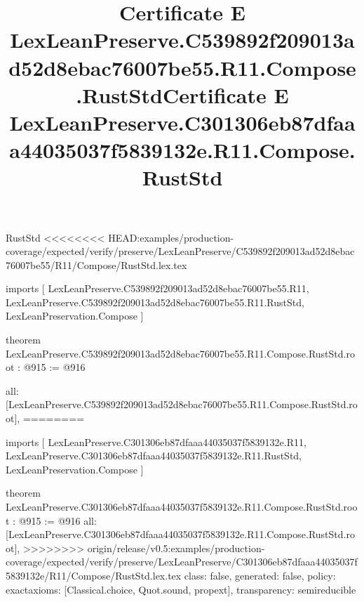 \begin{lexlean}{RustStd}
<<<<<<<< HEAD:examples/production-coverage/expected/verify/preserve/LexLeanPreserve/C539892f209013ad52d8ebac76007be55/R11/Compose/RustStd.lex.tex
\title{Certificate E LexLeanPreserve.C539892f209013ad52d8ebac76007be55.R11.Compose.RustStd}
\begin{coremodule}
imports [
  LexLeanPreserve.C539892f209013ad52d8ebac76007be55.R11,
  LexLeanPreserve.C539892f209013ad52d8ebac76007be55.R11.RustStd,
  LexLeanPreservation.Compose
]

theorem LexLeanPreserve.C539892f209013ad52d8ebac76007be55.R11.Compose.RustStd.root : @915 := @916 {
  all: [LexLeanPreserve.C539892f209013ad52d8ebac76007be55.R11.Compose.RustStd.root],
========
\title{Certificate E LexLeanPreserve.C301306eb87dfaaa44035037f5839132e.R11.Compose.RustStd}
\begin{coremodule}
imports [
  LexLeanPreserve.C301306eb87dfaaa44035037f5839132e.R11,
  LexLeanPreserve.C301306eb87dfaaa44035037f5839132e.R11.RustStd,
  LexLeanPreservation.Compose
]

theorem LexLeanPreserve.C301306eb87dfaaa44035037f5839132e.R11.Compose.RustStd.root : @915 := @916 {
  all: [LexLeanPreserve.C301306eb87dfaaa44035037f5839132e.R11.Compose.RustStd.root],
>>>>>>>> origin/release/v0.5:examples/production-coverage/expected/verify/preserve/LexLeanPreserve/C301306eb87dfaaa44035037f5839132e/R11/Compose/RustStd.lex.tex
  class: false,
  generated: false,
  policy: exact{axioms: [Classical.choice, Quot.sound, propext]},
  transparency: semireducible
}


\end{coremodule}}
\end{coremodule}
\end{lexlean}
